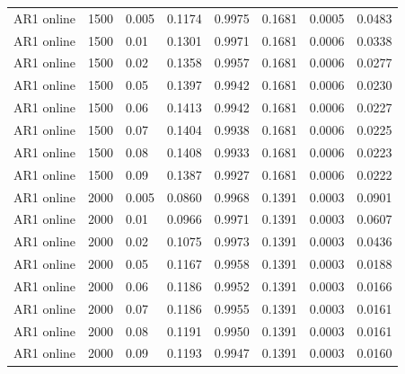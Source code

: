 \documentclass{article}
\begin{document}
\begin{longtable}[htbp]{l|l|l|*{5}{c}}
  AR1 online & 1500 & 0.005 & 0.1174 & 0.9975 & 0.1681 & 0.0005 & 0.0483\\
  AR1 online & 1500 & 0.01 & 0.1301 & 0.9971 & 0.1681 & 0.0006 & 0.0338\\
  AR1 online & 1500 & 0.02 & 0.1358 & 0.9957 & 0.1681 & 0.0006 & 0.0277\\
  AR1 online & 1500 & 0.05 & 0.1397 & 0.9942 & 0.1681 & 0.0006 & 0.0230\\
  AR1 online & 1500 & 0.06 & 0.1413 & 0.9942 & 0.1681 & 0.0006 & 0.0227\\
  AR1 online & 1500 & 0.07 & 0.1404 & 0.9938 & 0.1681 & 0.0006 & 0.0225\\
  AR1 online & 1500 & 0.08 & 0.1408 & 0.9933 & 0.1681 & 0.0006 & 0.0223\\
  AR1 online & 1500 & 0.09 & 0.1387 & 0.9927 & 0.1681 & 0.0006 & 0.0222\\
  AR1 online & 2000 & 0.005 & 0.0860 & 0.9968 & 0.1391 & 0.0003 & 0.0901\\
  AR1 online & 2000 & 0.01 & 0.0966 & 0.9971 & 0.1391 & 0.0003 & 0.0607\\
  AR1 online & 2000 & 0.02 & 0.1075 & 0.9973 & 0.1391 & 0.0003 & 0.0436\\
  AR1 online & 2000 & 0.05 & 0.1167 & 0.9958 & 0.1391 & 0.0003 & 0.0188\\
  AR1 online & 2000 & 0.06 & 0.1186 & 0.9952 & 0.1391 & 0.0003 & 0.0166\\
  AR1 online & 2000 & 0.07 & 0.1186 & 0.9955 & 0.1391 & 0.0003 & 0.0161\\
  AR1 online & 2000 & 0.08 & 0.1191 & 0.9950 & 0.1391 & 0.0003 & 0.0161\\
  AR1 online & 2000 & 0.09 & 0.1193 & 0.9947 & 0.1391 & 0.0003 & 0.0160\\
\end{longtable}
  
\end{document}
